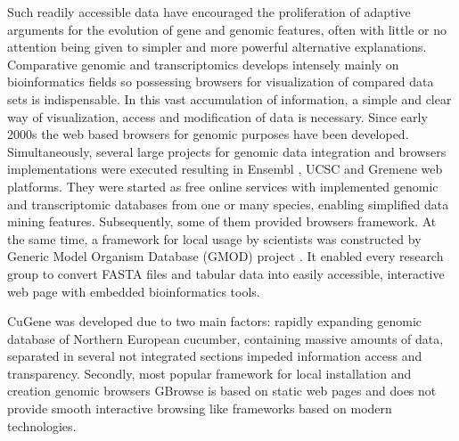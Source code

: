 \documentclass[a4paper]{spie}
\newcommand{\appName}{CuGene}
\begin{document}
Such readily accessible data have encouraged the proliferation of adaptive arguments for the evolution of gene and genomic features, often with little or no attention being given to simpler and more powerful alternative explanations. Comparative genomic and transcriptomics develops intensely mainly on bioinformatics fields so possessing browsers for visualization of compared data sets is indispensable.
In this vast accumulation of information,
a simple and clear way of visualization, access and modification of data is necessary.
Since early 2000s the web based browsers for genomic purposes have been developed.
Simultaneously, several large projects for genomic data integration and browsers implementations were executed
resulting in Ensembl \cite{hubbard2002ensembl}, UCSC \cite{karolchik2003ucsc} and Gremene \cite{ware2002gramene} web platforms.
They were started as free online services with implemented genomic and transcriptomic databases from one or many species,
enabling simplified data mining features.
Subsequently, some of them provided browsers framework.
At the same time, a framework for local usage by scientists was constructed by Generic Model Organism Database (GMOD) project \cite{stein2002generic}.
It enabled every research group to convert FASTA files and tabular data into easily accessible, interactive web page with embedded bioinformatics tools.

\appName{} was developed due to two main factors: rapidly expanding genomic database of Northern European cucumber, containing massive amounts of data,
separated in several not integrated sections impeded information access and transparency.
Secondly, most popular framework for local installation and creation genomic browsers GBrowse is based on static web pages and
does not provide smooth interactive browsing like frameworks based on modern technologies.
\end{document}
